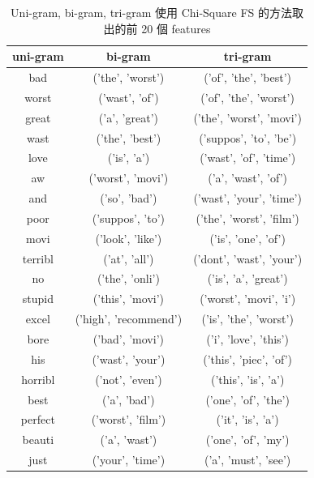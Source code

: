 \documentclass{article}[12pt]
\begin{document}
\begin{table}[H]
    \centering
    \caption{Uni-gram, bi-gram, tri-gram 使用 Chi-Square FS 的方法取出的前 20 個 features}
    \begin{tabular}{ccc} 
    \toprule
    \textbf{uni-gram} & \textbf{bi-gram}      & \textbf{tri-gram}         \\ 
    \hline
    bad               & ('the', 'worst')      & ('of', 'the', 'best')     \\
    worst             & ('wast', 'of')        & ('of', 'the', 'worst')    \\
    great             & ('a', 'great')        & ('the', 'worst', 'movi')  \\
    wast              & ('the', 'best')       & ('suppos', 'to', 'be')    \\
    love              & ('is', 'a')           & ('wast', 'of', 'time')    \\
    aw                & ('worst', 'movi')     & ('a', 'wast', 'of')       \\
    and               & ('so', 'bad')         & ('wast', 'your', 'time')  \\
    poor              & ('suppos', 'to')      & ('the', 'worst', 'film')  \\
    movi              & ('look', 'like')      & ('is', 'one', 'of')       \\
    terribl           & ('at', 'all')         & ('dont', 'wast', 'your')  \\
    no                & ('the', 'onli')       & ('is', 'a', 'great')      \\
    stupid            & ('this', 'movi')      & ('worst', 'movi', 'i')    \\
    excel             & ('high', 'recommend') & ('is', 'the', 'worst')    \\
    bore              & ('bad', 'movi')       & ('i', 'love', 'this')     \\
    his               & ('wast', 'your')      & ('this', 'piec', 'of')    \\
    horribl           & ('not', 'even')       & ('this', 'is', 'a')       \\
    best              & ('a', 'bad')          & ('one', 'of', 'the')      \\
    perfect           & ('worst', 'film')     & ('it', 'is', 'a')         \\
    beauti            & ('a', 'wast')         & ('one', 'of', 'my')       \\
    just              & ('your', 'time')      & ('a', 'must', 'see')      \\
    \bottomrule
    \end{tabular}
\end{table}
\end{document}
